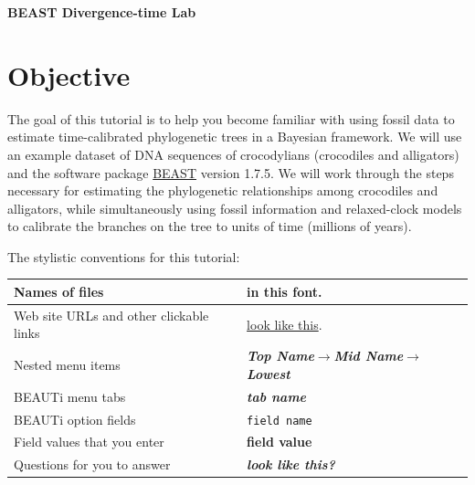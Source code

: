 \documentclass{article}
\newcommand{\localfile}[1]{\textsf{#1}\xspace}
\newcommand{\menutab}[1]{\textbf{\textit{#1}}\xspace}
\newcommand{\subsubItem}[3]{\menutab{#1}$\rightarrow$\menutab{#2}$\rightarrow$\menutab{#3}\xspace}
\newcommand{\program}[1]{#1\xspace}
\newcommand{\beast}{\href{http://beast.bio.ed.ac.uk/Main_Page}{\program{BEAST}}\xspace}
\newcommand{\field}[1]{\texttt{#1}\xspace}
\newcommand{\fieldvalue}[1]{{\bfseries\sffamily #1}\xspace}
\newcommand{\questionfont}[1]{{\bfseries\sffamily\textit{#1}}\xspace}
\begin{document}
{\Large\bf BEAST Divergence-time Lab}
{\singlespacing \tableofcontents}
\newpage

\section{Objective}
The goal of this tutorial is to help you become familiar with using fossil data
to estimate time-calibrated phylogenetic trees in a Bayesian framework.
We will use an example dataset of DNA sequences of crocodylians (crocodiles and alligators)
and the software package \beast version 1.7.5.
We will work through the steps necessary for estimating the phylogenetic
relationships among crocodiles and alligators, while simultaneously using
fossil information and relaxed-clock models to calibrate the branches on the
tree to units of time (millions of years).

The stylistic conventions for this tutorial:

\begin{tabular}{|p{3.2in}|p{2.8in}|}
\hline	Names of files & \localfile{in this font}.\\
\hline	Web site URLs and other clickable links &  \href{http://www.google.com}{look like this}.\\
\hline	Nested menu items & \subsubItem{Top Name}{Mid Name}{Lowest}\\
\hline	\program{BEAUTi} menu tabs & \menutab{tab name}\\
\hline	\program{BEAUTi} option fields & \field{field name}\\
\hline	Field values that you enter & \fieldvalue{field value}\\
\hline	Questions for you to answer & \questionfont{look like this?}\\
\hline
\end{tabular}


\end{document}
